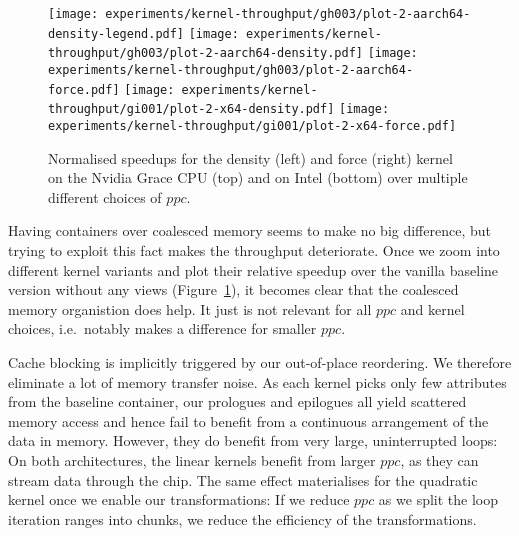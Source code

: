 \begin{figure}[htb]
\centering
 \texttt{[image: experiments/kernel-throughput/gh003/plot-2-aarch64-density-legend.pdf]}
 \texttt{[image: experiments/kernel-throughput/gh003/plot-2-aarch64-density.pdf]}
 \texttt{[image: experiments/kernel-throughput/gh003/plot-2-aarch64-force.pdf]}
 \texttt{[image: experiments/kernel-throughput/gi001/plot-2-x64-density.pdf]}
 \texttt{[image: experiments/kernel-throughput/gi001/plot-2-x64-force.pdf]}
 \caption{
  Normalised speedups for the density (left) and force (right) kernel on the Nvidia Grace CPU (top) and on Intel (bottom) over multiple different choices of $ppc$.
  \label{figure:transformation-overhead:normalised-speedups}
 }
\end{figure}


Having containers over coalesced memory seems to make no big difference, but trying to exploit this fact makes the throughput deteriorate.
Once we zoom into different kernel variants and plot their relative speedup over the vanilla baseline version without any views (Figure~\ref{figure:transformation-overhead:normalised-speedups}), it becomes clear that the coalesced memory organistion does help.
It just is not relevant for all $ppc$ and kernel choices, i.e.~notably makes a difference for smaller $ppc$.



%
%
Cache blocking is implicitly triggered by our out-of-place reordering.
We therefore eliminate a lot of memory transfer noise.
As each kernel picks only few attributes from the baseline container, our prologues and epilogues all yield scattered memory access and hence fail to benefit from a continuous arrangement of the data in memory.
However, they do benefit from very large, uninterrupted loops:
On both architectures, the linear kernels benefit from larger $ppc$, as they can stream data through the chip.
The same effect materialises for the quadratic kernel once we enable our transformations:
If we reduce $ppc$ as we split the loop iteration ranges into chunks, we reduce the efficiency of the transformations.



